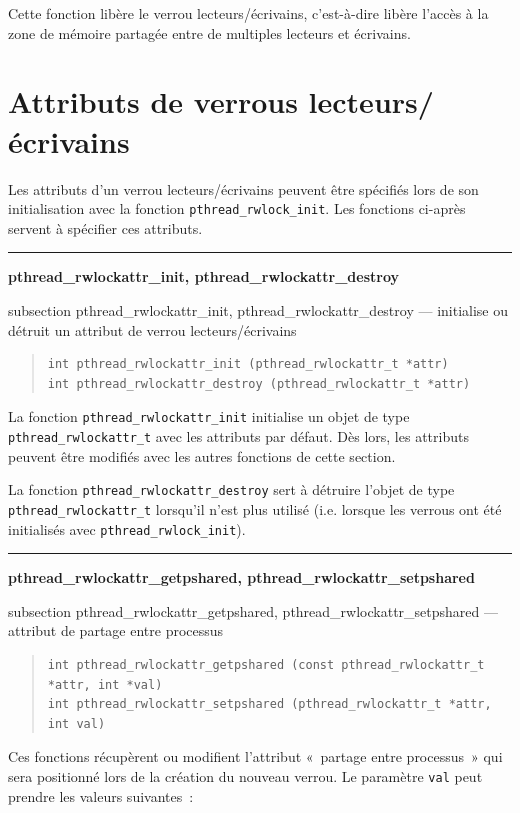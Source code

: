 \documentclass [twoside] {report}
\newcommand {\primitive} [1]
    {
	\phantomsection
	{\large \textbf {#1}}
	\addcontentsline {toc} {subsection} {#1}
    }
\newcommand {\separation}
    {
	\vspace {5mm}
	\nopagebreak
	\hrule
    }
\begin{document}
Cette fonction libère le verrou lecteurs/écrivains, c'est-à-dire
libère l'accès à la zone de mémoire partagée entre de multiples
lecteurs et écrivains.


\section {Attributs de verrous lecteurs/écrivains}

Les attributs d'un verrou lecteurs/écrivains peuvent
être spécifiés lors de son initialisation avec la fonction
\verb|pthread_rwlock_init|. Les fonctions ci-après servent à spécifier
ces attributs.

\separation
\primitive {pthread\_rwlockattr\_init, pthread\_rwlockattr\_destroy} ---
initialise ou détruit un attribut de verrou lecteurs/écrivains

\begin {quote}
\begin {verbatim}
int pthread_rwlockattr_init (pthread_rwlockattr_t *attr)
int pthread_rwlockattr_destroy (pthread_rwlockattr_t *attr)
\end{verbatim}
\end {quote}

La fonction \verb|pthread_rwlockattr_init| initialise un objet de type
\verb|pthread_rwlockattr_t| avec les attributs par défaut. Dès lors,
les attributs peuvent être modifiés avec les autres fonctions de
cette section.

La fonction \verb|pthread_rwlockattr_destroy| sert à détruire
l'objet de type \verb|pthread_rwlockattr_t| lorsqu'il n'est plus
utilisé (i.e.  lorsque les verrous ont été initialisés avec
\verb|pthread_rwlock_init|).


\separation
\primitive {pthread\_rwlockattr\_getpshared, pthread\_rwlockattr\_setpshared} --- attribut de partage entre processus

\begin {quote}
\begin {verbatim}
int pthread_rwlockattr_getpshared (const pthread_rwlockattr_t *attr, int *val)
int pthread_rwlockattr_setpshared (pthread_rwlockattr_t *attr, int val)
\end{verbatim}
\end {quote}

Ces fonctions récupèrent ou modifient l'attribut «~partage entre
processus~» qui sera positionné lors de la création du nouveau
verrou. Le paramètre \texttt {val} peut prendre les valeurs suivantes~:
\end{document}
